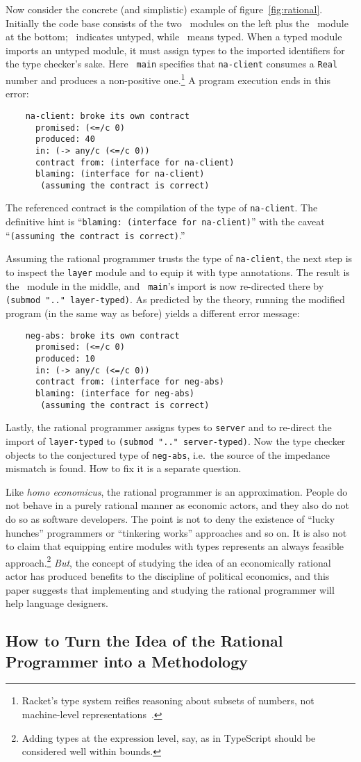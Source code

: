Now consider the concrete (and simplistic) example of figure~\ref{fig:rational}.
Initially the code base consists of the two \dyncolor\ modules on the left plus
the \typecolor\ module at the bottom; \dyncolor\ indicates untyped, while
\typecolor\ means typed. When a typed module imports an untyped module, it must
assign types to the imported identifiers for the type checker's sake. Here {\tt
main} specifies that {\tt na-client} consumes a {\tt Real} number and produces a
non-positive one.\footnote{Racket's type system reifies
reasoning about subsets of numbers, not machine-level
representations~\citep{stathff-padl-12}.} A program execution ends in this error:
\begin{verbatim}
    na-client: broke its own contract
      promised: (<=/c 0)
      produced: 40
      in: (-> any/c (<=/c 0))           
      contract from: (interface for na-client)
      blaming: (interface for na-client)
       (assuming the contract is correct)
\end{verbatim}
The referenced contract is the compilation of the type of {\tt na-client}. The
definitive hint is ``{\tt blaming: (interface for na-client)}'' with the caveat
``{\tt (assuming the contract is correct)}.''

Assuming the rational programmer trusts the type of {\tt na-client}, the next
step is to inspect the {\tt layer} module and to equip it with type
annotations. The result is the \typecolor\ module in the middle, and {\tt
main}'s import is now re-directed there by {\tt (submod ".." layer-typed)}. As
predicted by the theory, running the modified program (in the same way as before) yields a different error message:
\begin{verbatim}
    neg-abs: broke its own contract
      promised: (<=/c 0)
      produced: 10
      in: (-> any/c (<=/c 0))
      contract from: (interface for neg-abs)
      blaming: (interface for neg-abs)
       (assuming the contract is correct)
\end{verbatim}
Lastly, the rational programmer assigns types to {\tt server} and to re-direct
the import of {\tt layer-typed} to {\tt (submod ".." server-typed)}. Now the
type checker objects to the conjectured type of {\tt neg-abs}, i.e.\ the source
of the impedance mismatch is found. How to fix it is a separate question.

Like {\it homo economicus\/}, the rational programmer is an approximation.
People do not behave in a purely rational manner as economic actors, and they
also do not do so as software developers. The point is not to deny the existence
of ``lucky hunches'' programmers or ``tinkering works'' approaches and so on. It
is also not to claim that equipping entire modules with types represents an
always feasible approach.\footnote{Adding types at the expression level, say, as
in TypeScript should be considered well within bounds.}  {\em But\/}, the
concept of studying the idea of an economically rational actor has produced
benefits to the discipline of political economics, and this paper suggests that
implementing and studying the rational programmer will help language designers.

\subsection{How to Turn the Idea of the Rational Programmer into a Methodology} 
\label{sub:methodology}


